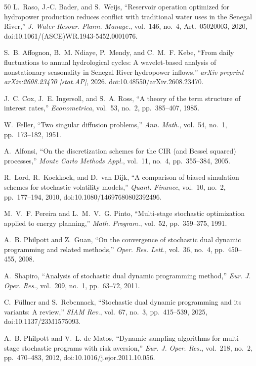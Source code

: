 \documentclass[11pt,a4paper]{article}
\begin{document}
\begin{thebibliography}{50}
 L.~Raso, J.-C. Bader, and S.~Weijs, ``Reservoir
operation optimized for hydropower production reduces conflict with traditional
water uses in the Senegal River,'' \emph{J. Water Resour. Plann. Manage.},
vol.~146, no.~4, Art.~05020003, 2020,
doi:10.1061/(ASCE)WR.1943-5452.0001076.

S.~B. Affognon, B.~M. Ndiaye, P.~Mendy, and C.~M.~F. Kebe,
``From daily fluctuations to annual hydrological cycles: A wavelet-based analysis
of nonstationary seasonality in Senegal River hydropower inflows,''
\emph{arXiv preprint arXiv:2608.23470 [stat.AP]}, 2026.
doi:10.48550/arXiv.2608.23470.

 J.~C. Cox, J.~E. Ingersoll, and S.~A. Ross, ``A theory of the
term structure of interest rates,'' \emph{Econometrica}, vol.~53, no.~2,
pp.~385--407, 1985.

 W.~Feller, ``Two singular diffusion problems,'' \emph{Ann.
Math.}, vol.~54, no.~1, pp.~173--182, 1951.

 A.~Alfonsi, ``On the discretization schemes for the CIR
(and Bessel squared) processes,'' \emph{Monte Carlo Methods Appl.}, vol.~11,
no.~4, pp.~355--384, 2005.

 R.~Lord, R.~Koekkoek, and D.~van Dijk, ``A
comparison of biased simulation schemes for stochastic volatility models,''
\emph{Quant. Finance}, vol.~10, no.~2, pp.~177--194, 2010,
doi:10.1080/14697680802392496.

 M.~V.~F. Pereira and L.~M.~V.~G. Pinto, ``Multi-stage
stochastic optimization applied to energy planning,'' \emph{Math. Program.},
vol.~52, pp.~359--375, 1991.

 A.~B. Philpott and Z.~Guan, ``On the convergence of
stochastic dual dynamic programming and related methods,'' \emph{Oper. Res.
Lett.}, vol.~36, no.~4, pp.~450--455, 2008.

 A.~Shapiro, ``Analysis of stochastic dual dynamic
programming method,'' \emph{Eur. J. Oper. Res.}, vol.~209, no.~1, pp.~63--72,
2011.

 C.~F\"ullner and S.~Rebennack, ``Stochastic
dual dynamic programming and its variants: A review,'' \emph{SIAM Rev.},
vol.~67, no.~3, pp.~415--539, 2025, doi:10.1137/23M1575093.

 A.~B. Philpott and V.~L. de Matos,
``Dynamic sampling algorithms for multi-stage stochastic programs with risk
aversion,'' \emph{Eur. J. Oper. Res.}, vol.~218, no.~2, pp.~470--483, 2012,
doi:10.1016/j.ejor.2011.10.056.


\end{thebibliography}
\end{document}
